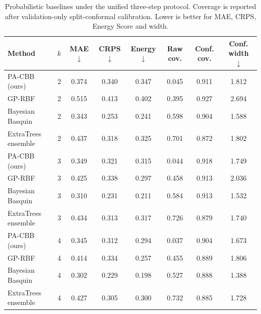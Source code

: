 \begin{table}[t]
\caption{Probabilistic baselines under the unified three-step protocol. Coverage is reported after validation-only split-conformal calibration. Lower is better for MAE, CRPS, Energy Score and width.}
\label{tab:probabilistic_baselines}
\centering\scriptsize\setlength{\tabcolsep}{3.5pt}
\begin{tabular}{lccccccc}
\toprule
Method & $k$ & MAE $\downarrow$ & CRPS $\downarrow$ & Energy $\downarrow$ & Raw cov. & Conf. cov. & Conf. width $\downarrow$ \\
\midrule
PA-CBB (ours) & 2 & 0.374 & 0.340 & 0.347 & 0.045 & 0.911 & 1.812 \\
GP-RBF & 2 & 0.515 & 0.413 & 0.402 & 0.395 & 0.927 & 2.694 \\
Bayesian Basquin & 2 & 0.343 & 0.253 & 0.241 & 0.598 & 0.904 & 1.588 \\
ExtraTrees ensemble & 2 & 0.437 & 0.318 & 0.325 & 0.701 & 0.872 & 1.802 \\
\addlinespace[2pt]
PA-CBB (ours) & 3 & 0.349 & 0.321 & 0.315 & 0.044 & 0.918 & 1.749 \\
GP-RBF & 3 & 0.425 & 0.338 & 0.297 & 0.458 & 0.913 & 2.036 \\
Bayesian Basquin & 3 & 0.310 & 0.231 & 0.211 & 0.584 & 0.913 & 1.532 \\
ExtraTrees ensemble & 3 & 0.434 & 0.313 & 0.317 & 0.726 & 0.879 & 1.740 \\
\addlinespace[2pt]
PA-CBB (ours) & 4 & 0.345 & 0.312 & 0.294 & 0.037 & 0.904 & 1.673 \\
GP-RBF & 4 & 0.414 & 0.334 & 0.257 & 0.455 & 0.889 & 1.806 \\
Bayesian Basquin & 4 & 0.302 & 0.229 & 0.198 & 0.527 & 0.888 & 1.388 \\
ExtraTrees ensemble & 4 & 0.427 & 0.305 & 0.300 & 0.732 & 0.885 & 1.728 \\
\bottomrule
\end{tabular}
\end{table}